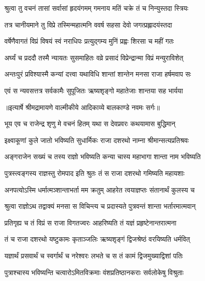 \twolineshloka
{श्रुत्वा तु वचनं तासां सर्वासां हृदयंगमम्}
{गमनाय मतिं चक्रे तं च निन्युस्तदा स्त्रियः} %

\twolineshloka
{तत्र चानीयमाने तु विप्रे तस्मिन्महात्मनि}
{ववर्ष सहसा देवो जगत्प्रह्लादयंस्तदा} %

\twolineshloka
{वर्षेणैवागतं विप्रं विषयं स्वं नराधिपः}
{प्रत्युद्गम्य मुनिं प्रह्वः शिरसा च महीं गतः} %

\twolineshloka
{अर्घ्यं च प्रददौ तस्मै न्यायतः सुसमाहितः}
{वव्रे प्रसादं विप्रेन्द्रान्मा विप्रं मन्युराविशेत्} %

\twolineshloka
{अन्तःपुरं प्रविश्यास्मै कन्यां दत्त्वा यथाविधि}
{शान्तां शान्तेन मनसा राजा हर्षमवाप सः} %

\twolineshloka
{एवं स न्यवसत्तत्र सर्वकामैः सुपूजितः}
{ऋष्यशृङ्गो महातेजाः शान्तया सह भार्यया} %


{॥इत्यार्षे श्रीमद्रामायणे वाल्मीकीये आदिकाव्ये बालकाण्डे नवमः सर्गः॥}


\twolineshloka
{भूय एव च राजेन्द्र शृणु मे वचनं हितम्}
{यथा स देवप्रवरः कथयामास बुद्धिमान्} %

\twolineshloka
{इक्ष्वाकूणां कुले जातो भविष्यति सुधार्मिकः}
{राजा दशरथो नाम्ना श्रीमान्सत्यप्रतिश्रवः} %

\twolineshloka
{अङ्गराजेन सख्यं च तस्य राज्ञो भविष्यति}
{कन्या चास्य महाभागा शान्ता नाम भविष्यति} %

\twolineshloka
{पुत्रस्त्वङ्गस्य राज्ञस्तु रोमपाद इति श्रुतः}
{तं स राजा दशरथो गमिष्यति महायशाः} %

\twolineshloka
{अनपत्योऽस्मि धर्मात्मञ्शान्ताभर्ता मम क्रतुम्}
{आहरेत त्वयाज्ञप्तः संतानार्थं कुलस्य च} %

\twolineshloka
{श्रुत्वा राज्ञोऽथ तद्वाक्यं मनसा स विचिन्त्य च}
{प्रदास्यते पुत्रवन्तं शान्ता भर्तारमात्मवान्} %

\twolineshloka
{प्रतिगृह्य च तं विप्रं स राजा विगतज्वरः}
{आहरिष्यति तं यज्ञं प्रहृष्टेनान्तरात्मना} %

\twolineshloka
{तं च राजा दशरथो यष्टुकामः कृताञ्जलिः}
{ऋष्यशृङ्गं द्विजश्रेष्ठं वरयिष्यति धर्मवित्} %

\twolineshloka
{यज्ञार्थं प्रसवार्थं च स्वर्गार्थं च नरेश्वरः}
{लभते च स तं कामं द्विजमुख्याद्विशां पतिः} %

\twolineshloka
{पुत्राश्चास्य भविष्यन्ति चत्वारोऽमितविक्रमाः}
{वंशप्रतिष्ठानकराः सर्वलोकेषु विश्रुताः} %

